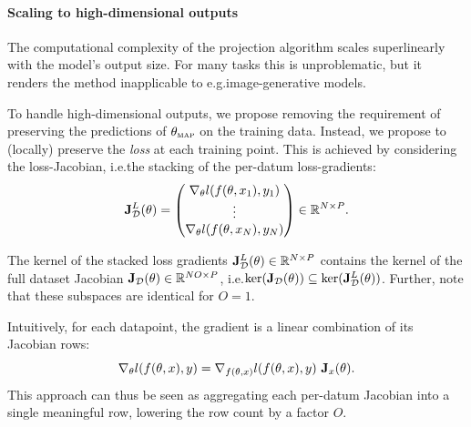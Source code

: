 \paragraph{Scaling to high-dimensional outputs}
\label{subsec:null:high_dim_outputs}
The computational complexity of the projection algorithm scales superlinearly with the model's output size. For many tasks this is unproblematic, but it renders the method inapplicable to e.g.\@ image-generative models.

To handle high-dimensional outputs, we propose removing the requirement of preserving the predictions of $\theta_{\textsc{map}}$ on the training data. Instead, we propose to (locally) preserve the \emph{loss} at each training point.
This is achieved by considering the loss-Jacobian, i.e.\@ the stacking of the per-datum loss-gradients:
\begin{equation}
    \mathbf{J}^{L}_{\mathcal{D}}(\theta)
    =
    \begin{pmatrix}
        \nabla_{\theta}l(f(\theta,x_1),y_1) \\
        \vdots \\
        \nabla_{\theta}l(f(\theta,x_N),y_N)
    \end{pmatrix}
    \in \mathbb{R}^{N \times P}.
\end{equation}
\begin{lemma}
\label{lm:null:lossker_contains_ker}
    The kernel of the stacked loss gradients $\mathbf{J}^{L}_{\mathcal{D}}(\theta) \in \mathbb{R}^{N \times P}$ contains the kernel of the full dataset Jacobian $\mathbf{J}_{\mathcal D}(\theta)\in\mathbb{R}^{NO\times P}$, i.e.\@ $\ker(\mathbf{J}_{\mathcal D}(\theta)) \subseteq \ker(\mathbf{J}^{L}_{\mathcal{D}}(\theta))$.
    Further, note that these subspaces are identical for $O=1$.
\end{lemma}

Intuitively, for each datapoint, the gradient is a linear combination of its Jacobian rows:
\[
\nabla_{\theta}l(f(\theta,x),y)
=
\nabla_{f(\theta,x)}l(f(\theta,x),y)\ \mathbf{J}_x(\theta).
\]
This approach can thus be seen as aggregating each per-datum Jacobian into a single meaningful row, lowering the row count by a factor $O$.

